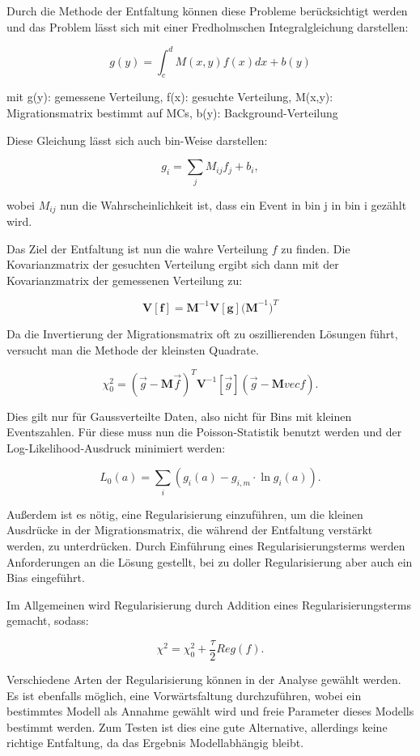 Durch die Methode der Entfaltung können diese Probleme berücksichtigt werden und das Problem lässt sich mit einer Fredholmschen Integralgleichung darstellen:

\begin{equation}
 g(y)= \int_c^d M(x,y) f(x) dx + b(y)
\end{equation}
\begin{centering}
  \tiny{mit g(y): gemessene Verteilung, f(x): gesuchte Verteilung, M(x,y): Migrationsmatrix bestimmt auf MCs, b(y): Background-Verteilung}
 \end{centering}

Diese Gleichung lässt sich auch bin-Weise darstellen:

\begin{equation}
 g_i=\sum_j M_{ij}f_j+b_i,
\end{equation}

wobei $M_{ij}$ nun die Wahrscheinlichkeit ist, dass ein Event in bin j in bin i gezählt wird.

Das Ziel der Entfaltung ist nun die wahre Verteilung $f$ zu finden.
Die Kovarianzmatrix der gesuchten Verteilung ergibt sich dann mit der Kovarianzmatrix der gemessenen Verteilung zu:

\begin{equation}
 \mathbf{V[f]}=\mathbf{M}^{-1}\mathbf{V[g]}\mathbf{(M}^{-1})^T
\end{equation}

Da die Invertierung der Migrationsmatrix oft zu oszillierenden Lösungen führt, versucht man die Methode der kleinsten Quadrate.

\begin{equation}
 \chi_0^2=(\vec{g}-\mathbf{M}\vec{f})^T \mathbf{V}^{-1}[\vec{g}](\vec{g}-\mathbf{M}vec{f}).
\end{equation}

Dies gilt nur für Gaussverteilte Daten, also nicht für Bins mit kleinen Eventszahlen.
Für diese muss nun die Poisson-Statistik benutzt werden und der Log-Likelihood-Ausdruck minimiert werden:

\begin{equation}
 L_0(a)=\sum_i (g_i(a)-g_{i,m}\cdot \ln g_i(a)).
\end{equation}

Außerdem ist es nötig, eine Regularisierung einzuführen, um die kleinen Ausdrücke in der Migrationsmatrix, die während der Entfaltung verstärkt werden, zu unterdrücken.
Durch Einführung eines Regularisierungsterms werden Anforderungen an die Lösung gestellt, bei zu doller Regularisierung aber auch ein Bias eingeführt.

Im Allgemeinen wird Regularisierung durch Addition eines Regularisierungsterms gemacht, sodass:

\begin{equation}
 \chi^2=\chi_0^2 +\frac{\tau}{2} Reg(f).
\end{equation}

Verschiedene Arten der Regularisierung können in der Analyse gewählt werden.
Es ist ebenfalls möglich, eine Vorwärtsfaltung durchzuführen, wobei ein bestimmtes Modell als Annahme gewählt wird und freie Parameter dieses Modells bestimmt werden.
Zum Testen ist dies eine gute Alternative, allerdings keine richtige Entfaltung, da das Ergebnis Modellabhängig bleibt.
